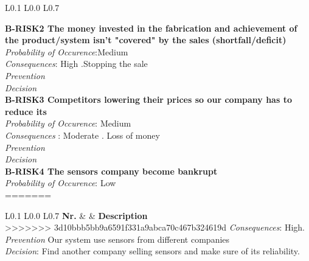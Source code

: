 \begin{longtable}{L{0.1\textwidth} L{0.0\textwidth} L{0.7\textwidth}}
	
	\textbf{ B-RISK2 The money invested in the fabrication and achievement of the product/system isn't "covered" by the sales (shortfall/deficit)} \\
	\textit{Probability of Occurence}:Medium \\
	\textit{Consequences}: High .Stopping the sale \\
	\textit{Prevention} \\
	\textit{Decision} \\
	
	\textbf{ B-RISK3 Competitors lowering their prices so our company has to reduce its} \\
	\textit{Probability of Occurence}: Medium \\
	\textit{Consequences} : Moderate . Loss of money \\
	\textit{Prevention} \\
	\textit{Decision} \\
	
	\textbf{ B-RISK4 The sensors company become bankrupt} \\
	\textit{Probability of Occurence}: Low \\
=======
\begin{longtable}{L{0.1\textwidth} L{0.0\textwidth} L{0.7\textwidth}}
	\textbf{Nr.} &  & \textbf{Description} \\
>>>>>>> 3d10bbb5bb9a6591f331a9abca70c467b324619d
	\textit{Consequences}: High.\\
	\textit{Prevention} Our system use sensors from different companies \\
	\textit{Decision}: Find another company selling sensors and make sure of its reliability. \\


\end{longtable}
\end{longtable}
